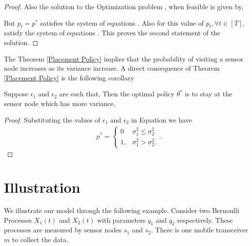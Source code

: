 \documentclass[a4paper,english,12pt]{article}
\begin{document}
\begin{proof}
  Also the solution to the Optimization problem , when feasible is given by,
    
  But $p_t=p^*$ satisfies the system of equations . Also for this value of $p_t, \forall t \in [T]$,   satisfy the system of equations . 
    This proves the second statement of the solution.
  
  
  \end{proof}


The Theorem \ref{Placement  Policy} implies that the probability of visiting a sensor node increases as its variance increase. A direct consequence of Theorem \ref{Placement Policy} is the following corollary

\begin{cor}
Suppose $\epsilon_1$ and $\epsilon_2$ are such that, 
Then the optimal policy $\theta^*$ is to stay at the sensor node which has more variance,


\end{cor}
\begin{proof}
Substituting the values of $\epsilon_1$ and $\epsilon_2$ in Equation  we have \begin{align}
    & p^* =\begin{cases}
      0 & \sigma_1^2 \leq \sigma_2^2\\
     1, &  \sigma_1^2 > \sigma_2^2.
    \end{cases}.
    \end{align}
    

\end{proof}

\section{Illustration}
We illustrate our model through the following example. Consider two Bernoulli Processes $X_1(t)$ and $X_2(t)$ with parameters $q_1$ and $q_2$ respectively. These processes are measured by sensor nodes $s_1$ and $s_2$. There is one mobile  transceiver $m$ to collect the data.
\end{document}
